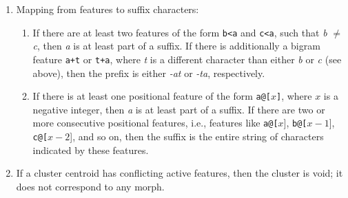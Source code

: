 \begin{enumerate}
  \item Mapping from features to suffix characters:
   \begin{enumerate}
   \item If there are at least two features of the form \texttt{b<a} and \texttt{c<a}, such that \textit{b} $\ne$ \textit{c}, then \textit{a} is at least part of a suffix. If there is additionally a bigram feature \texttt{a+t} or \texttt{t+a}, where \textit{t} is a different character than either \textit{b} or \textit{c} (see above), then the prefix is either \textit{-at} or \textit{-ta}, respectively.

   \item If there is at least one positional feature of the form \texttt{a@[}$x$\texttt{]}, where $x$ is a negative integer, then \textit{a} is at least part of a suffix. If there are two or more consecutive positional features, i.e., features like \texttt{a@[}$x${]}, \texttt{b@[}$x-1${]},\texttt{ c@[}$x-2${]}, and so on, then the suffix is the entire string of characters indicated by these features.
   \end{enumerate}
  \item If a cluster centroid has conflicting active features, then the cluster is void; it does not correspond to any morph.
\end{enumerate}

